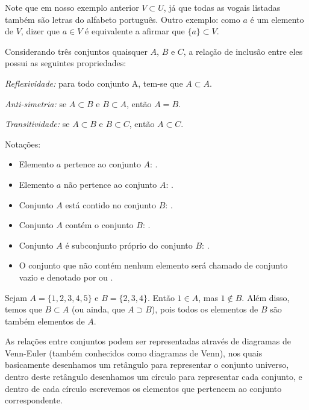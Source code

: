 Note que em nosso exemplo anterior $V \subset U$, já que todas as vogais listadas também são letras do alfabeto português. Outro exemplo: como $a$ é um elemento de $V$, dizer que $a \in V$ é equivalente a afirmar que $\{a\} \subset V$.

\vskip0.4cm

Considerando três conjuntos quaisquer $A$, $B$ e $C$, a relação de inclusão entre eles possui as seguintes propriedades:

\textit{Reflexividade:} para todo conjunto A, tem-se que $A \subset A$.

\textit{Anti-simetria:} se $A \subset B$ e $B \subset A$, então $A= B$.

\textit{Transitividade:} se $A \subset B$ e $B \subset C$, então $A \subset C$.

\newpage

Notações:
\begin{itemize}
 \item Elemento $a$ pertence ao conjunto $A$: .
 \item Elemento $a$ não pertence ao conjunto $A$: .
 \item Conjunto $A$ está contido no conjunto $B$: .
 \item Conjunto $A$ contém o conjunto $B$: .
 \item Conjunto $A$ é subconjunto próprio do conjunto $B$: .
 \item O conjunto que não contém nenhum elemento será chamado de conjunto vazio e denotado por \destaque{\emptyset} ou \destaque{\{ \}}.
\end{itemize}

\vskip0.4cm

 \begin{exem}
  Sejam $A= \{1, 2, 3, 4, 5 \}$ e $B=\{ 2, 3, 4\}$. Então $1 \in A$, mas $1 \notin B$. Além disso, temos que $B \subset A$ (ou ainda, que $A \supset B$), pois todos os elementos de $B$ são também elementos de $A$.
 \end{exem}

 As relações entre conjuntos podem ser representadas através de diagramas de Venn-Euler (também conhecidos como diagramas de Venn), nos quais basicamente desenhamos um retângulo para representar o conjunto universo, dentro deste retângulo desenhamos um círculo para representar cada conjunto, e dentro de cada círculo escrevemos os elementos que pertencem ao conjunto correspondente.

